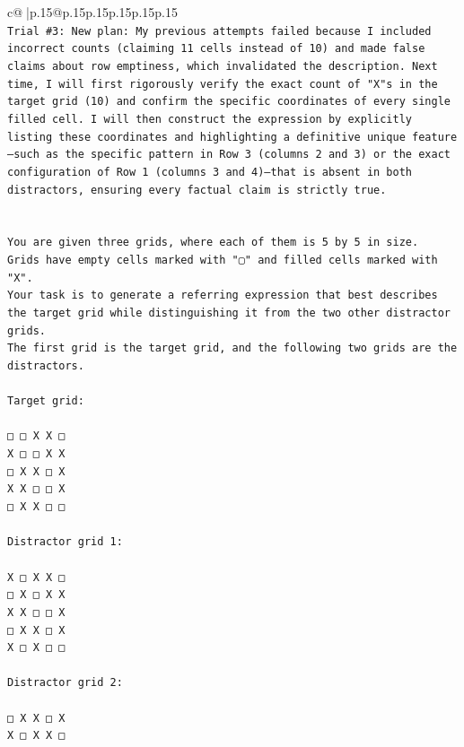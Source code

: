 \documentclass{article}
\begin{document}
{\begin{supertabular}{c@{$\;$}|p{.15\linewidth}@{}p{.15\linewidth}p{.15\linewidth}p{.15\linewidth}p{.15\linewidth}p{.15\linewidth}}
{{{\\ 
\texttt{Trial \#3: New plan: My previous attempts failed because I included incorrect counts (claiming 11 cells instead of 10) and made false claims about row emptiness, which invalidated the description. Next time, I will first rigorously verify the exact count of "X"s in the target grid (10) and confirm the specific coordinates of every single filled cell. I will then construct the expression by explicitly listing these coordinates and highlighting a definitive unique feature—such as the specific pattern in Row 3 (columns 2 and 3) or the exact configuration of Row 1 (columns 3 and 4)—that is absent in both distractors, ensuring every factual claim is strictly true.} \\
\\ 
\\ 
\texttt{You are given three grids, where each of them is 5 by 5 in size.} \\
\texttt{Grids have empty cells marked with "▢" and filled cells marked with "X".} \\
\texttt{Your task is to generate a referring expression that best describes the target grid while distinguishing it from the two other distractor grids.} \\
\texttt{The first grid is the target grid, and the following two grids are the distractors.} \\
\\ 
\texttt{Target grid:} \\
\\ 
\texttt{□ □ X X □} \\
\texttt{X □ □ X X} \\
\texttt{□ X X □ X} \\
\texttt{X X □ □ X} \\
\texttt{□ X X □ □} \\
\\ 
\texttt{Distractor grid 1:} \\
\\ 
\texttt{X □ X X □} \\
\texttt{□ X □ X X} \\
\texttt{X X □ □ X} \\
\texttt{□ X X □ X} \\
\texttt{X □ X □ □} \\
\\ 
\texttt{Distractor grid 2:} \\
\\ 
\texttt{□ X X □ X} \\
\texttt{X □ X X □} \\
}}}
\end{supertabular}}
\end{document}
